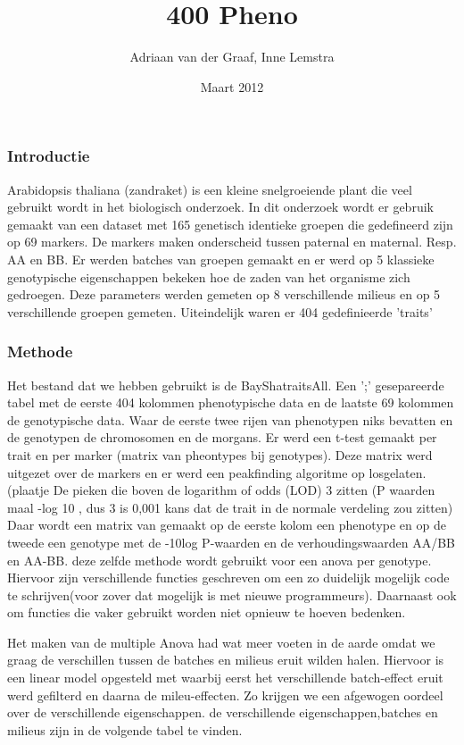 \documentclass[12pt,a4paper, twocolumn]{article}
\author{Adriaan van der Graaf, Inne Lemstra}
\title{400 Pheno}
\date{Maart 2012}
\begin{document}
\maketitle

\subsubsection*{Introductie}
Arabidopsis thaliana (zandraket) is een kleine snelgroeiende plant die veel gebruikt wordt in het biologisch onderzoek.
In dit onderzoek wordt er gebruik gemaakt van een dataset met 165 genetisch identieke groepen die gedefineerd zijn op 69 markers.
De markers maken onderscheid tussen paternal en maternal. Resp. AA en BB.
Er werden batches van groepen gemaakt en er werd op 5 klassieke genotypische eigenschappen bekeken hoe de zaden van het organisme zich gedroegen.
Deze parameters werden gemeten op 8 verschillende milieus en op 5 verschillende groepen gemeten.
Uiteindelijk waren er 404 gedefinieerde 'traits'\\
\subsubsection*{Methode}
Het bestand dat we hebben gebruikt is de BayShatraitsAll. 
Een ';' gesepareerde tabel met de eerste 404 kolommen phenotypische data en de laatste 69 kolommen de genotypische data.
Waar de eerste twee rijen van phenotypen niks bevatten en de genotypen de chromosomen en de morgans.
Er werd een t-test gemaakt per trait en per marker (matrix van pheontypes bij genotypes).
Deze matrix werd uitgezet over de markers en er werd een peakfinding algoritme op losgelaten. (plaatje
De pieken die boven de logarithm of odds (LOD) 3 zitten (P waarden maal -log 10 , dus 3 is 0,001 kans dat de trait in de normale verdeling zou zitten)
Daar wordt een matrix van gemaakt op de eerste kolom een phenotype en op de tweede een genotype met de -10log P-waarden en de  verhoudingswaarden AA/BB en AA-BB.
deze zelfde methode wordt gebruikt voor een anova per genotype. 
Hiervoor zijn verschillende functies geschreven om een zo duidelijk mogelijk code te schrijven(voor zover dat mogelijk is met nieuwe programmeurs).
Daarnaast ook om functies die vaker gebruikt worden niet opnieuw te hoeven bedenken.

Het maken van de multiple Anova had wat meer voeten in de aarde omdat we graag de verschillen tussen de batches en milieus eruit wilden halen.
Hiervoor is een linear model opgesteld met waarbij eerst het verschillende batch-effect eruit werd gefilterd en daarna de mileu-effecten.
Zo krijgen we een afgewogen oordeel over de verschillende eigenschappen.
de verschillende eigenschappen,batches en milieus zijn in de volgende tabel te vinden.\\
\end{document}
